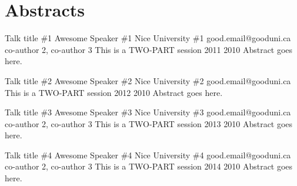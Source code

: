 \chapter{Abstracts}




\iffalse
\begin{talk}
 {Talk title \#1}%
 {Awesome Speaker \#1}%
 {Nice University \#1}%
 {good.email@gooduni.ca}%
 {co-author 2, co-author 3}%
 {This is a TWO-PART session}%
 {}%
 {2011}%
 {2010}%
Abstract goes here.
\end{talk}

\begin{talk}
	{Talk title \#2}%
	{Awesome Speaker \#2}%
	{Nice University \#2}%
	{good.email@gooduni.ca}%
	{}%
	{This is a TWO-PART session}%
	{}%
	{2012}%
	{2010}%
	Abstract goes here.
\end{talk}

\begin{talk}
	{Talk title \#3}%
	{Awesome Speaker \#3}%
	{Nice University \#3}%
	{good.email@gooduni.ca}%
	{co-author 2, co-author 3}%
	{This is a TWO-PART session}%
	{}%
	{2013}%
	{2010}%
	Abstract goes here.
\end{talk}

\begin{talk}
	{Talk title \#4}%
	{Awesome Speaker \#4}%
	{Nice University \#4}%
	{good.email@gooduni.ca}%
	{co-author 2, co-author 3}%
	{This is a TWO-PART session}%
	{}%
	{2014}%
	{2010}%
	Abstract goes here.
\end{talk}


